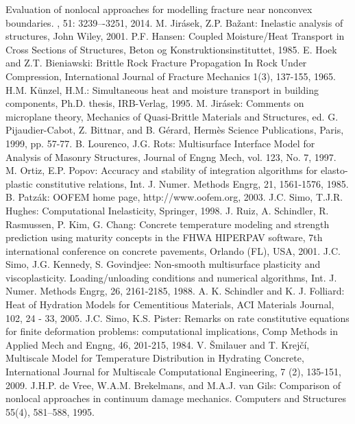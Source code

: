 \documentclass[a4paper]{article}
\begin{document}
\begin{thebibliography}{99}
\newblock  Evaluation of nonlocal approaches for modelling fracture near nonconvex boundaries.
, 51: 3239–-3251, 2014.
 M. Jir\'asek, Z.P. Ba\v zant: Inelastic analysis of
  structures, John Wiley, 2001.
 P.F. Hansen: Coupled Moisture/Heat Transport in
  Cross Sections of Structures, Beton og Konstruktionsinstituttet, 1985.
 E. Hoek and Z.T. Bieniawski: Brittle Rock Fracture Propagation
In Rock Under Compression, International Journal of Fracture Mechanics
1(3), 137-155, 1965.
 H.M. K{\"u}nzel, H.M.: Simultaneous heat and
  moisture transport in building components, Ph.D. thesis, IRB-Verlag,
  1995.
 M. Jir\'{a}sek: Comments on microplane theory, Mechanics of Quasi-Brittle Materials and Structures, ed. G. Pijaudier-Cabot, Z. Bittnar, and B. G\'{e}rard, Herm\`{e}s Science Publications, Paris, 1999, pp. 57-77.
 B. Lourenco, J.G. Rots: Multisurface Interface Model for Analysis of Masonry Structures, Journal of Engng Mech, vol. 123, No. 7, 1997.
 M. Ortiz, E.P. Popov: Accuracy and stability of integration algorithms for elasto-plastic constitutive relations, Int. J. Numer. Methods Engrg, 21, 1561-1576, 1985.
 B. Patz\'ak: OOFEM home page, http://www.oofem.org, 2003.
 J.C. Simo, T.J.R. Hughes: Computational Inelasticity, Springer, 1998.
 J. Ruiz, A. Schindler, R. Rasmussen, P. Kim, G. Chang: Concrete temperature modeling and strength prediction using maturity concepts in the FHWA HIPERPAV software, 7th international conference on concrete pavements, Orlando (FL), USA, 2001.
 J.C. Simo, J.G. Kennedy, S. Govindjee: Non-smooth multisurface plasticity and viscoplasticity. Loading/unloading conditions and numerical algorithms, Int. J. Numer. Methods Engrg, 26, 2161-2185, 1988.
 A. K. Schindler and K. J. Folliard: Heat of Hydration Models for Cementitious Materials, ACI Materials Journal, 102, 24 - 33, 2005.
 J.C. Simo, K.S. Pister: Remarks on rate constitutive equations for finite deformation problems: computational implications, Comp Methods in Applied Mech and Engng, 46, 201-215, 1984.
 V. \v{S}milauer and T. Krej\v{c}\'i, Multiscale
  Model for Temperature Distribution in Hydrating Concrete,
  International Journal for Multiscale Computational Engineering, 7
  (2), 135-151, 2009.
 J.H.P. de Vree, W.A.M. Brekelmans, and M.A.J. van Gils: Comparison of nonlocal approaches in continuum damage mechanics. Computers and Structures 55(4), 581–588, 1995.

\end{thebibliography}
\end{document}
